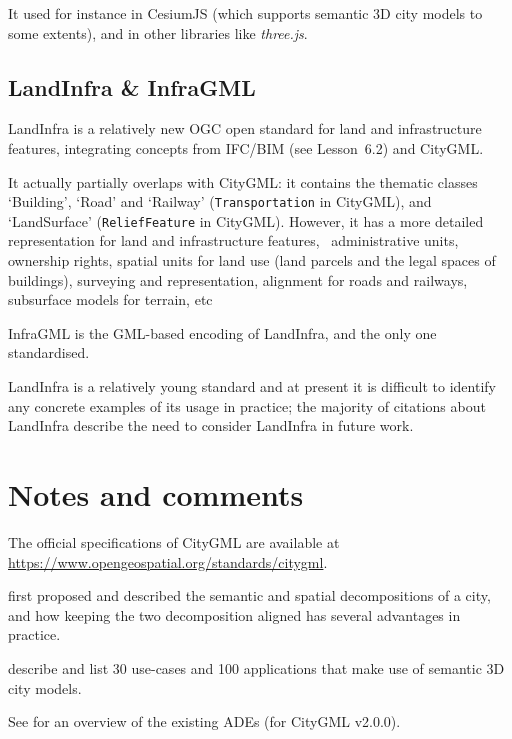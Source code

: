 It used for instance in CesiumJS (which supports semantic 3D city models to some extents), and in other libraries like \emph{three.js}.



\subsection{LandInfra \& InfraGML}

LandInfra is a relatively new OGC open standard for land and infrastructure features, integrating concepts from IFC/BIM (see Lesson~6.2) and CityGML\@.

It actually partially overlaps with CityGML: it contains the thematic classes `Building', `Road' and `Railway' (\texttt{Transportation} in CityGML), and `LandSurface' (\texttt{ReliefFeature} in CityGML). 
However, it has a more detailed representation for land and infrastructure features, \eg\ administrative units, ownership rights, spatial units for land use (land parcels and the legal spaces of buildings), surveying and representation, alignment for roads and railways, subsurface models for terrain, etc

InfraGML is the GML-based encoding of LandInfra, and the only one standardised.

LandInfra is a relatively young standard and at present it is difficult to identify any concrete examples of its usage in practice; the majority of citations about LandInfra describe the need to consider LandInfra in future work.


%
\section{Notes and comments}

The official specifications of CityGML are available at \url{https://www.opengeospatial.org/standards/citygml}.

\citep{Stadler07} first proposed and described the semantic and spatial decompositions of a city, and how keeping the two decomposition aligned has several advantages in practice.

\citet{Biljecki15a} describe and list 30 use-cases and 100 applications that make use of semantic 3D city models.

See \citet{Biljecki18} for an overview of the existing ADEs (for CityGML v2.0.0).

